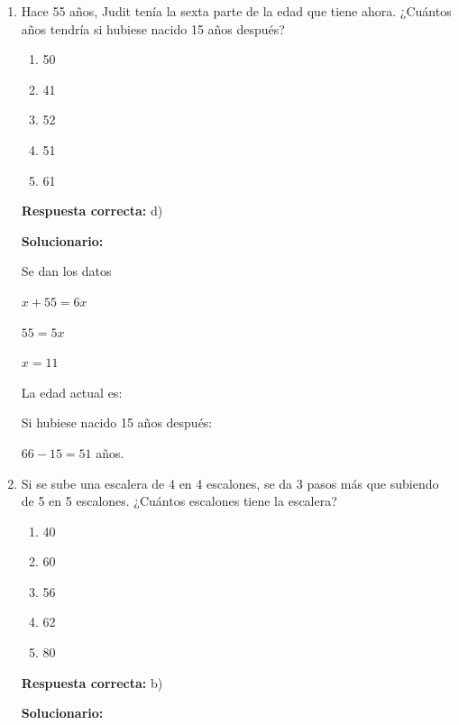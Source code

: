 \begin{enumerate}
	
	\item Hace 55 años, Judit tenía la sexta parte de la edad que tiene ahora. ¿Cuántos años tendría si hubiese nacido 15 años después?
	\begin{enumerate}[label=\alph*)]
		\item 50
		\item 41
		\item 52
		\item 51
		\item 61
	\end{enumerate}
	\textbf{Respuesta correcta:} d)
	
	\vspace{2mm}
	\textbf{Solucionario:}\\
	
	
	Se dan los datos
	
	$x+55=6x$
	
	$55=5x$
	
	$x=11$
	
	La edad actual es:
	
	
	Si hubiese nacido 15 años después:
	
	$66-15=51$ años.
	
	\vspace{6mm}
	
	\item Si se sube una escalera de 4 en 4 escalones, se da 3 pasos más que subiendo de 5 en 5 escalones. ¿Cuántos escalones tiene la escalera?
	\begin{enumerate}[label=\alph*)]
		\item 40
		\item 60
		\item 56
		\item 62
		\item 80
	\end{enumerate}
	\textbf{Respuesta correcta:} b)
	
	\vspace{2mm}
	\textbf{Solucionario:}\\
	

\end{enumerate}

